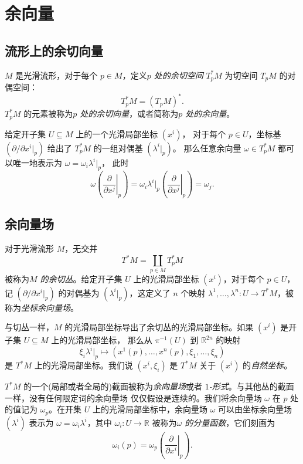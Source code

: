 \documentclass[fontset=none]{Notes}
\begin{document}
\section{余向量}

\subsection{流形上的余切向量}

$M$ 是光滑流形，对于每个 $p\in M$，定义\emph{$p$ 处的余切空间}
$T_p^*M$ 为切空间 $T_pM$ 的对偶空间：
\[
  T_p^*M=(T_pM)^*.  
\]
$T_p^*M$ 的元素被称为\emph{$p$ 处的余切向量}，或者简称为\emph{$p$ 处的余向量}。

给定开子集 $U\subseteq M$ 上的一个光滑局部坐标 $\left(x^i\right)$，
对于每个 $p\in U$，坐标基 $\left(\partial /\partial x^i|_p\right)$
给出了 $T_p^*M$ 的一组对偶基 $\left(\lambda^i|_p\right)$。
那么任意余向量 $\omega\in T_p^*M$ 都可以唯一地表示为 $\omega=\omega_i\lambda^i|_p$，
此时
\[
  \omega\left(\left.\frac{\partial}{\partial x^j}\right|_p\right)=\omega_i  
  \lambda^i|_p\left(\left.\frac{\partial}{\partial x^j}\right|_p\right)
  =\omega_j.
\]

\subsection{余向量场}

对于光滑流形 $M$，无交并
\[
  T^*M=\coprod_{p\in M}T_p^*M  
\]
被称为\emph{$M$ 的余切丛}。给定开子集 $U$ 上的光滑局部坐标
$\left(x^i\right)$，对于每个 $p\in U$，记 $\left(\partial/\partial x^i|_p\right)$
的对偶基为 $\left(\lambda^i|_p\right)$，这定义了 $n$ 个映射
$\lambda^1,\dots,\lambda^n:U\to T^*M$，被称为\emph{坐标余向量场}。

与切丛一样，$M$ 的光滑局部坐标导出了余切丛的光滑局部坐标。如果 
$\left(x^i\right)$ 是开子集 $U\subseteq M$ 上的光滑局部坐标，
那么从 $\pi^{-1}(U)$ 到 $\mathbb{R}^{2n}$ 的映射
\[
  \xi_i\lambda^i|_p \mapsto 
  \left(x^1(p),\dots,x^n(p),\xi_1,\dots,\xi_n\right)
\]
是 $T^*M$ 上的光滑局部坐标。我们说 $\left(x^i,\xi_i\right)$ 是
$T^*M$ 关于 $\left(x^i\right)$ 的\emph{自然坐标}。

$T^*M$ 的一个(局部或者全局的)截面被称为\emph{余向量场}或者
\emph{$1$-形式}。与其他丛的截面一样，没有任何限定词的余向量场
仅仅假设是连续的。我们将余向量场 $\omega$ 在 $p$ 处的值记为
$\omega_p$。在开集 $U$ 上的光滑局部坐标中，余向量场 $\omega$
可以由坐标余向量场 $\left(\lambda^i\right)$ 表示为
$\omega=\omega_i\lambda^i$，其中 $\omega_i:U\to \mathbb{R}$
被称为\emph{$\omega$ 的分量函数}，它们刻画为
\[
  \omega_i(p)=\omega_p\left(\left.\frac{\partial}{\partial x^i}\right|_p\right).  
\]
\end{document}
